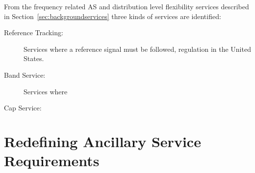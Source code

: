 From the frequency related AS and distribution level flexibility services described in Section~\ref{sec:backgroundservices} three kinds of services are identified:
\begin{description}
	\item[Reference Tracking:] Services where a reference signal must be followed, \eg regulation in the United States.
	\item[Band Service:] Services where 
	\item[Cap Service:]
\end{description}
%
\section{Redefining Ancillary Service Requirements} %
\label{sec:Redefining Ancillary Service Requirements}


